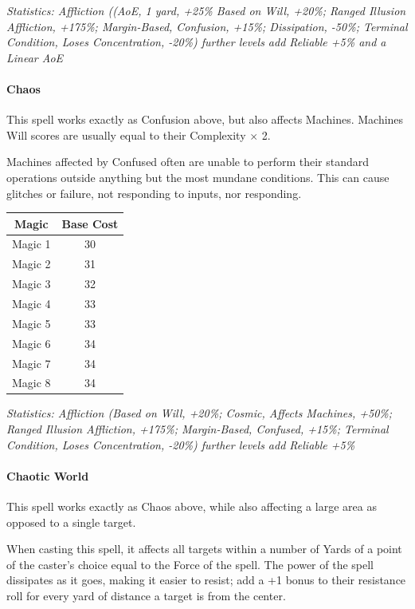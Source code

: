\begin{multicols*}{3}
	\textcolor{OliveGreen}{\textit{Statistics: Affliction ((AoE, 1 yard, +25\% Based on Will, +20\%; Ranged Illusion Affliction, +175\%; Margin-Based, Confusion, +15\%; Dissipation, -50\%; Terminal Condition, Loses Concentration, -20\%)  further levels add Reliable +5\% and a Linear AoE}}
	
	\paragraph{Chaos}
	
	This spell works exactly as Confusion above, but also affects Machines. Machines Will scores are usually equal to their Complexity $\times$ 2.
	
	Machines affected by Confused often are unable to perform their standard operations outside anything but the most mundane conditions. This can cause glitches or failure, not responding to inputs, nor responding.
	
	\begin{center}
		\begin{tabular}{|c|c|}
			\hline
			Magic & Base Cost \\
			\hline
			\hline
			Magic 1 & 30 \\
			Magic 2 & 31 \\
			Magic 3 & 32 \\
			Magic 4 & 33 \\
			Magic 5 & 33 \\
			Magic 6 & 34 \\
			Magic 7 & 34 \\
			Magic 8 & 34 \\
			\hline
		\end{tabular}
	\end{center}	
	
	\textcolor{OliveGreen}{\textit{Statistics: Affliction (Based on Will, +20\%; Cosmic, Affects Machines, +50\%; Ranged Illusion Affliction, +175\%; Margin-Based, Confused, +15\%; Terminal Condition, Loses Concentration, -20\%)  further levels add Reliable +5\%}}
	
	\paragraph{Chaotic World}
	
	This spell works exactly as Chaos above, while also affecting a large area as opposed to a single target.
	
	When casting this spell, it affects all targets within a number of Yards of a point of the caster's choice equal to the Force of the spell. The power of the spell dissipates as it goes, making it easier to resist; add a +1 bonus to their resistance roll for every yard of distance a target is from the center.
	

\end{multicols*}
